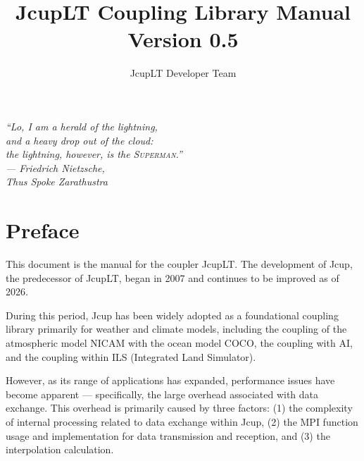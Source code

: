 \documentclass[11pt,a4paper]{report}
\title{JcupLT Coupling Library Manual\\
Version 0.5}
\author{JcupLT Developer Team}
\begin{document}
\maketitle

\vspace*{\fill}
\begin{flushright}
\begin{minipage}{0.75\textwidth}
\raggedleft
\large\itshape
``Lo, I am a herald of the lightning,\\
and a heavy drop out of the cloud:\\
the lightning, however, is the \textsc{Superman}.''\\[1em]
\normalsize\upshape
--- Friedrich Nietzsche,\\
\textit{Thus Spoke Zarathustra}
\end{minipage}
\end{flushright}
\vspace*{\fill}
 
\clearpage

\tableofcontents

\chapter*{Preface}

This document is the manual for the coupler JcupLT.
The development of Jcup\cite{Arakawa2011,  Arakawa2020}, the predecessor of JcupLT,
began in 2007 and continues to be improved as of 2026.

During this period, Jcup has been widely adopted as a foundational coupling library primarily for weather and climate models, including the coupling of the atmospheric model NICAM\cite{Satoh2014, Satoh2019} with the ocean model COCO\cite{Miyakawa2017}, the coupling with AI\cite{Arakawa2022}, and the coupling within ILS (Integrated Land Simulator)\cite{Nitta2020}.

However, as its range of applications has expanded,
performance issues have become apparent ---
specifically, the large overhead
associated with data exchange.
This overhead is primarily caused by three factors:
(1) the complexity of internal processing
related to data exchange within Jcup,
(2) the MPI function usage and implementation
for data transmission and reception,
and (3) the interpolation calculation.
\end{document}
